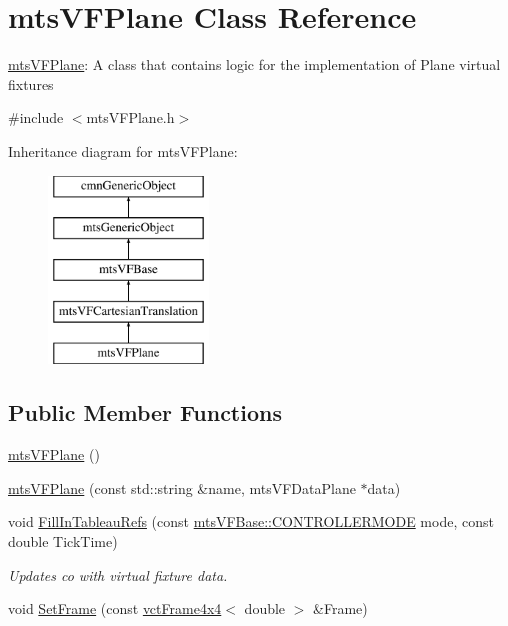 \hypertarget{classmts_v_f_plane}{}\section{mts\+V\+F\+Plane Class Reference}
\label{classmts_v_f_plane}


\hyperlink{classmts_v_f_plane}{mts\+V\+F\+Plane}\+: A class that contains logic for the implementation of Plane virtual fixtures  




{\ttfamily \#include $<$mts\+V\+F\+Plane.\+h$>$}

Inheritance diagram for mts\+V\+F\+Plane\+:\begin{figure}[H]
\begin{center}
\leavevmode
\includegraphics[height=5.000000cm]{de/dc6/classmts_v_f_plane}
\end{center}
\end{figure}
\subsection*{Public Member Functions}
\begin{DoxyCompactItemize}
\item 
\hyperlink{classmts_v_f_plane_a052cfafc7f08e6222a439c2b196ff193}{mts\+V\+F\+Plane} ()
\item 
\hyperlink{classmts_v_f_plane_a33c2747719b8174022e5c0865919171e}{mts\+V\+F\+Plane} (const std\+::string \&name, mts\+V\+F\+Data\+Plane $\ast$data)
\item 
void \hyperlink{classmts_v_f_plane_a23097d9359e426edaf5584de27f2a696}{Fill\+In\+Tableau\+Refs} (const \hyperlink{classmts_v_f_base_a742dd08f8b70bafeb746cec14d9ee974}{mts\+V\+F\+Base\+::\+C\+O\+N\+T\+R\+O\+L\+L\+E\+R\+M\+O\+D\+E} mode, const double Tick\+Time)
\begin{DoxyCompactList}\small\item\em Updates co with virtual fixture data. \end{DoxyCompactList}\item 
void \hyperlink{classmts_v_f_plane_ac5c7f2ac79d75c1a1976650ebcb3084b}{Set\+Frame} (const \hyperlink{classvct_frame4x4}{vct\+Frame4x4}$<$ double $>$ \&Frame)
\end{DoxyCompactItemize}
